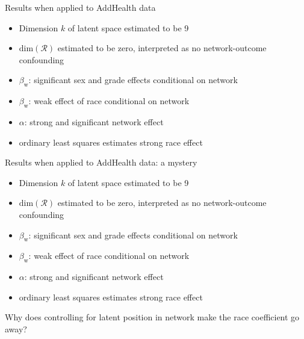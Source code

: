 \documentclass{beamer}
\theoremstyle{remark}
\begin{document}
\begin{frame}{Results when applied to AddHealth data}

    \begin{itemize}
        \item Dimension $k$ of latent space estimated to be 9
        \item $\mathrm{dim}(\mathcal R)$ estimated to be zero, interpreted as no network-outcome confounding
        \item $\beta_\text{w}$: significant sex and grade effects conditional on network
        \item $\beta_\text{w}$: weak effect of race conditional on network
        \item $\alpha$: strong and significant network effect
        \item ordinary least squares estimates strong race effect
    \end{itemize}

\end{frame}

\begin{frame}{Results when applied to AddHealth data: a mystery}

    \begin{itemize}
        \item Dimension $k$ of latent space estimated to be 9
        \item $\mathrm{dim}(\mathcal R)$ estimated to be zero, interpreted as no network-outcome confounding
        \item $\beta_\text{w}$: significant sex and grade effects conditional on network
        \item $\beta_\text{w}$: weak effect of race conditional on network
        \item $\alpha$: strong and significant network effect
        \item ordinary least squares estimates strong race effect
    \end{itemize}

    Why does controlling for latent position in network make the race coefficient go away?

\end{frame}
\end{document}
